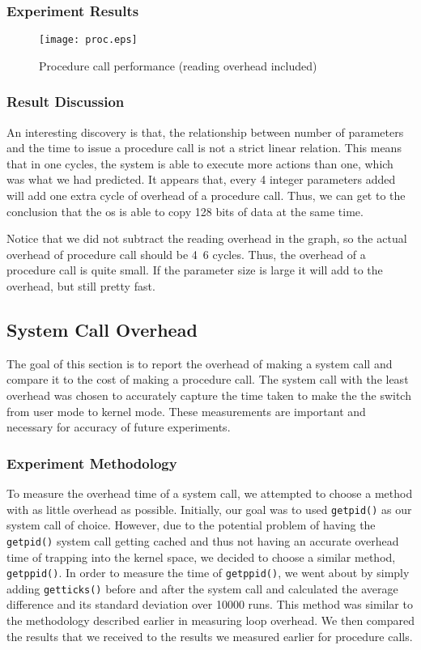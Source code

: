 \documentclass{article} %
\begin{document}
\subsubsection{Experiment Results}

\begin{figure}[!htb]
  \centering
  \texttt{[image: proc.eps]}
  \caption{Procedure call performance (reading overhead included)}
  \label{fig:proc}
\end{figure}

\subsubsection{Result Discussion}
An interesting discovery is that, the relationship between number of
parameters and the time to issue a procedure call is not a strict linear
relation. This means that in one cycles, the system is able to execute more actions than one, which was what we had predicted.
It appears that, every 4 integer parameters added will add one extra cycle of
overhead of a procedure call. Thus, we can get to the conclusion that the os
is able to copy 128 bits of data at the same time.

Notice that we did not subtract the reading overhead in the graph, so the
actual overhead of procedure call should be 4~6 cycles. Thus, the overhead of
a procedure call is quite small. If the parameter size is large it will add to
the overhead, but still pretty fast.

\subsection{System Call Overhead}
The goal of this section is to report the overhead of making a system call and
compare it to the cost of making a procedure call. The system call with the
least overhead was chosen to accurately capture the time taken to make the the
switch from user mode to kernel mode. These measurements are important and
necessary for accuracy of future experiments.

\subsubsection{Experiment Methodology}
To measure the overhead time of a system call, we attempted to choose a method
with as little overhead as possible. Initially, our goal was to used
\texttt{getpid()} as our system call of choice. However, due to the potential
problem of having the \texttt{getpid()} system call getting cached and thus
not having an accurate overhead time of trapping into the kernel space, we
decided to choose a similar method, \texttt{getppid()}. In order to measure
the time of \texttt{getppid()}, we went about by simply adding
\texttt{getticks()} before and after the system call and calculated the
average difference and its standard deviation over 10000 runs. This method was
similar to the methodology described earlier in measuring loop overhead. We
then compared the results that we received to the results we measured earlier
for procedure calls.
\end{document}
